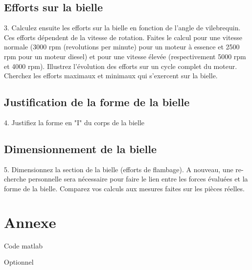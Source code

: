 \documentclass[a4paper,oneside,12pt]{report}
\begin{document}
\section{Efforts sur la bielle}
3. Calculez ensuite les efforts sur la bielle en fonction de l’angle de vilebrequin.
Ces efforts dépendent de la vitesse de rotation. Faites le calcul pour une vitesse
normale (3000 rpm (revolutions per minute) pour un moteur à essence et 2500
rpm pour un moteur diesel) et pour une vitesse élevée (respectivement 5000 rpm
et 4000 rpm). Illustrez l’évolution des efforts sur un cycle complet du moteur.
Cherchez les efforts maximaux et minimaux qui s’exercent sur la bielle.

\section{Justification de la forme de la bielle}
4. Justifiez la forme en "I" du corps de la bielle

\section{Dimensionnement de la bielle}
5. Dimensionnez la section de la bielle (efforts de flambage). A nouveau, une re-
cherche personnelle sera nécessaire pour faire le lien entre les forces évaluées
et la forme de la bielle. Comparez vos calculs aux mesures faites sur les pièces
réelles.

\chapter{Annexe}
Code matlab

Optionnel
\end{document}
